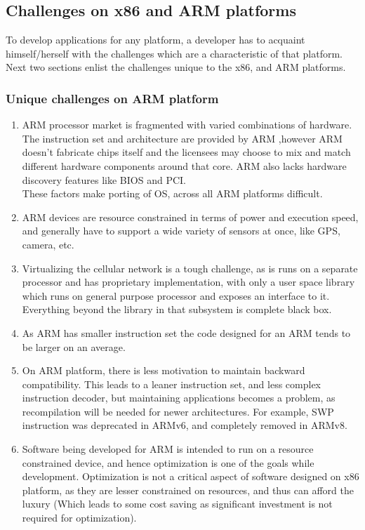 \documentclass[a4paper,10pt]{article}
\begin{document}
\subsection{Challenges on x86 and ARM platforms}
To develop applications for any platform, a developer has to acquaint himself/herself with the challenges which are a characteristic of that platform. Next two sections enlist the
challenges unique to the x86, and ARM platforms.

\subsubsection{Unique challenges on ARM platform}
\begin{enumerate}
 
\item ARM processor market is fragmented with varied combinations of hardware. The instruction set and architecture are provided by ARM ,however ARM doesn't fabricate chips itself and the licensees may choose to mix and match different hardware components around that core. ARM also lacks hardware discovery features like BIOS and PCI.
\\These factors make porting of OS, across all ARM platforms difficult.

\item ARM devices are resource constrained in terms of power and execution speed, and generally have to support a wide variety of sensors at once, like GPS, camera, etc.

\item Virtualizing the cellular network is a tough challenge, as is runs on a separate processor and has proprietary implementation, with only a user space library which runs on general purpose processor and exposes an interface to it. Everything beyond the library in that subsystem is complete black box.

\item As ARM has smaller instruction set the code designed for an ARM tends to be larger on an average.

\item On ARM platform, there is less motivation to maintain backward compatibility. This leads to a leaner instruction set, and less complex instruction decoder, but
maintaining applications becomes a problem, as recompilation will be needed for newer architectures. For example, SWP instruction was deprecated in ARMv6, and completely
removed in ARMv8.

\item Software being developed for ARM is intended to run on a resource constrained device, and hence optimization is one of the goals while development. Optimization is not a critical aspect of software designed on x86 platform, as they are lesser constrained on resources, and thus can afford the luxury (Which leads to some cost saving as significant investment is not required for optimization).

\end{enumerate}
\end{document}
